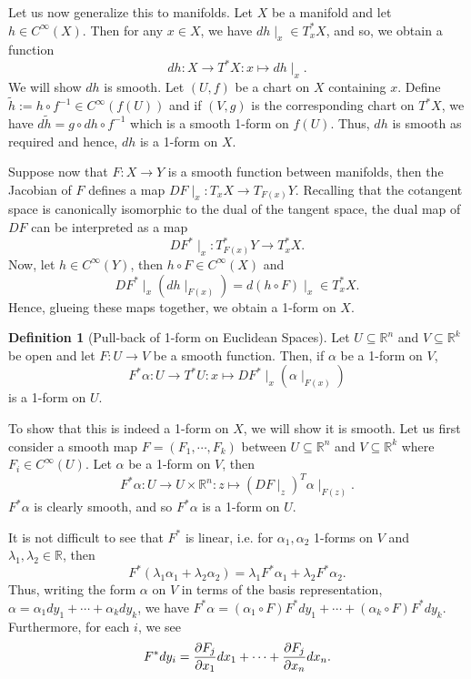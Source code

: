 \documentclass[]{article}
\theoremstyle{definition}
\theoremstyle{definition}
\newtheorem{definition}{Definition}[section]
\begin{document}
Let us now generalize this to manifolds. Let \(X\) be a manifold and let 
\(h \in C^\infty(X)\). Then for any \(x \in X\), we have 
\(dh\mid_x \in T^*_x X\), and so, we obtain a function 
\[dh : X \to T^* X : x \mapsto dh\mid_x.\]
We will show \(dh\) is smooth. Let \((U, f)\) be a chart on \(X\) containing 
\(x\). Define \(\tilde h := h \circ f^{-1} \in C^\infty(f(U))\) and if 
\((V, g)\) is the corresponding chart on \(T^* X\), we have 
\(d\tilde h = g \circ dh \circ f^{-1}\) which is a smooth 1-form on \(f(U)\).
Thus, \(dh\) is smooth as required and hence, \(dh\) is a 1-form on \(X\).

Suppose now that \(F : X \to Y\) is a smooth function between manifolds, 
then the Jacobian of \(F\) defines a map \(DF\mid_x : T_x X \to T_{F(x)} Y\). 
Recalling that the cotangent space is canonically isomorphic to the dual 
of the tangent space, the dual map of \(DF\) can be interpreted as a map 
\[DF^*\mid_x : T^*_{F(x)}Y \to T^*_x X.\]
Now, let \(h \in C^{\infty}(Y)\), then \(h \circ F \in C^\infty(X)\) and 
\[DF^*\mid_x(dh\mid_{F(x)}) = d(h \circ F)\mid_x \in T^*_x X.\]
Hence, glueing these maps together, we obtain a 1-form on \(X\).

\begin{definition}[Pull-back of 1-form on Euclidean Spaces]
  Let \(U \subseteq \mathbb{R}^n\) and \(V \subseteq \mathbb{R}^k\) be open and 
  let \(F : U \to V\) be a smooth function. 
  Then, if \(\alpha\) be a 1-form on \(V\), 
  \[F^* \alpha : U \to T^* U : x \mapsto DF^*\mid_x(\alpha\mid_{F(x)})\]
  is a 1-form on \(U\).
\end{definition}

To show that this is indeed a 1-form on \(X\), we will show it is smooth. 
Let us first consider a smooth map \(F = (F_1, \cdots, F_k)\) between 
\(U \subseteq \mathbb{R}^n\) and \(V \subseteq \mathbb{R}^k\) where 
\(F_i \in C^\infty(U)\). Let \(\alpha\) be a 1-form on \(V\), then 
\[F^*\alpha : U \to U \times \mathbb{R}^n : z \mapsto (DF\mid_z)^T \alpha\mid_{F(z)}.\]
\(F^*\alpha\) is clearly smooth, and so \(F^*\alpha\) is a 1-form on \(U\).

It is not difficult to see that \(F^*\) is linear, i.e. for \(\alpha_1, \alpha_2\) 
1-forms on \(V\) and \(\lambda_1, \lambda_2 \in \mathbb{R}\), then 
\[F^*(\lambda_1\alpha_1 + \lambda_2\alpha_2) = \lambda_1 F^*\alpha_1 + 
  \lambda_2 F^*\alpha_2.\] 
Thus, writing the form \(\alpha\) on \(V\) in terms of the basis representation, 
\(\alpha = \alpha_1 dy_1 + \cdots + \alpha_k dy_k\), we have 
\(F^* \alpha = (\alpha_1 \circ F) F^* dy_1 + \cdots + (\alpha_k \circ F) F^* dy_k\).
Furthermore, for each \(i\), we see 
\[F^*dy_i = \pdv{F_j}{x_1} dx_1 + \cdots + \pdv{F_j}{x_n} dx_n.\]
\end{document}
